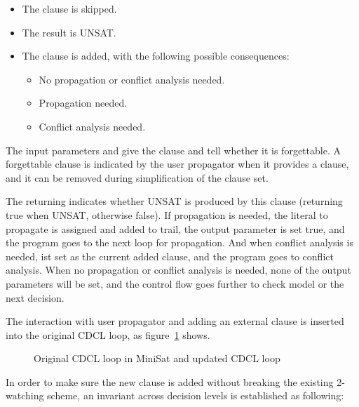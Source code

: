 \begin{itemize}
  \item The clause is skipped.
  \item The result is UNSAT.
  \item The clause is added, with the following possible consequences:
    \begin{itemize}
      \item No propagation or conflict analysis needed.
      \item Propagation needed.
      \item Conflict analysis needed.
    \end{itemize}
\end{itemize}

The input parameters  and  give the clause and tell whether it is forgettable. A forgettable clause is indicated by the user propagator when it provides a clause, and it can be removed during simplification of the clause set.

The returning  indicates whether UNSAT is produced by this clause (returning true when UNSAT, otherwise false). If propagation is needed, the literal to propagate is assigned and added to trail, the output parameter  is set true, and the program goes to the next loop for propagation. And when conflict analysis is needed,  ist set as the current added clause, and the program goes to conflict analysis. When no propagation or conflict analysis is needed, none of the output parameters will be set, and the control flow goes further to check model or the next decision.

The interaction with user propagator and adding an external clause is inserted into the original CDCL loop, as figure~\ref{fig:flow} shows.

\begin{figure}
  \centering
  
  \caption{Original CDCL loop in MiniSat and updated CDCL loop}
  \label{fig:flow}
\end{figure}

In order to make sure the new clause is added without breaking the existing 2-watching scheme, an invariant across decision levels is established as following:

